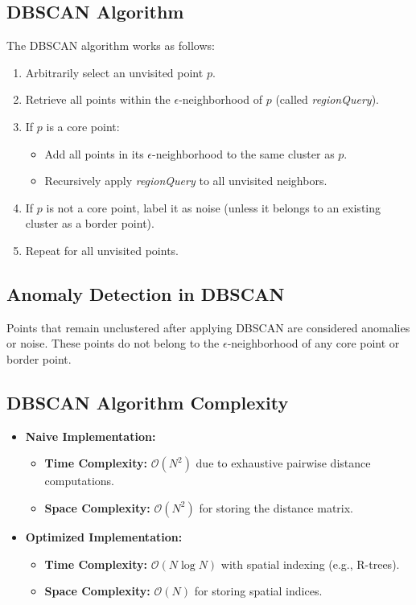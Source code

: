 \documentclass[12pt,a4paper]{article}
\begin{document}
\subsection{DBSCAN Algorithm}
The DBSCAN algorithm works as follows:
\begin{enumerate}
    \item Arbitrarily select an unvisited point $p$.
    \item Retrieve all points within the $\epsilon$-neighborhood of $p$ (called \textit{regionQuery}).
    \item If $p$ is a core point:
    \begin{itemize}
        \item Add all points in its $\epsilon$-neighborhood to the same cluster as $p$.
        \item Recursively apply \textit{regionQuery} to all unvisited neighbors.
    \end{itemize}
    \item If $p$ is not a core point, label it as noise (unless it belongs to an existing cluster as a border point).
    \item Repeat for all unvisited points.
\end{enumerate}

\subsection{Anomaly Detection in DBSCAN}
Points that remain unclustered after applying DBSCAN are considered anomalies or noise. These points do not belong to the $\epsilon$-neighborhood of any core point or border point.

\subsection{DBSCAN Algorithm Complexity}
\begin{itemize}
    \item \textbf{Naive Implementation:}
    \begin{itemize}
        \item \textbf{Time Complexity:} $\mathcal{O}(N^2)$ due to exhaustive pairwise distance computations.
        \item \textbf{Space Complexity:} $\mathcal{O}(N^2)$ for storing the distance matrix.
    \end{itemize}
    \item \textbf{Optimized Implementation:}
    \begin{itemize}
        \item \textbf{Time Complexity:} $\mathcal{O}(N \log N)$ with spatial indexing (e.g., R-trees).
        \item \textbf{Space Complexity:} $\mathcal{O}(N)$ for storing spatial indices.
    \end{itemize}
\end{itemize}
\end{document}
